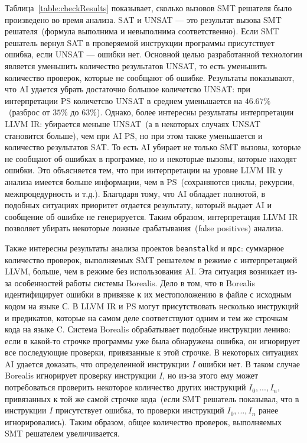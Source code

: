 Таблица~\ref{table:checkResults} показывает, сколько вызовов SMT решателя было
произведено во время анализа. SAT и UNSAT --- это результат вызова 
SMT решателя~(формула выполнима и невыполнима соответственно). Если SMT решатель
вернул SAT в проверяемой инструкции программы присутствует ошибка, если 
UNSAT --- ошибки нет. Основной целью разработанной технологии является уменьшить
количество результатов UNSAT, то есть уменьшить количество проверок, которые не
сообщают об ошибке. Результаты показывают, что AI удается убрать достаточно 
большое количетсво UNSAT: при интерпретации PS количетсво UNSAT в среднем 
уменьшается на $46.67\%$~(разброс от $35\%$ до $63\%$). Однако, более интересны 
результаты интерпретации LLVM IR: убирается меньше UNSAT~(а в некоторых
случаях UNSAT становится больше), чем при AI PS, но при этом также уменьшается 
и количество результатов SAT. То есть AI убирает не только SMT вызовы, которые 
не сообщают об ошибках в программе, но и некоторые вызовы, которые находят 
ошибки. Это объясняется тем, что при интерпретации на уровне LLVM IR у анализа 
имеется больше информации, чем в PS~(сохраняются циклы, рекурсии, 
межпроцедурность и т.д.). Благодаря тому, что AI обладает полнотой, в подобных
ситуациях приоритет отдается результату, который выдает AI и сообщение об
ошибке не генерируется. Таким образом, интерпретация LLVM IR позволяет убирать
некоторые ложные срабатывания~(false positives) анализа.

Также интересны результаты анализа проектов \texttt{beanstalkd} и \texttt{mpc}:
суммарное количество проверок, выполняемых SMT решателем в режиме с 
интерпретацией LLVM, больше, чем в режиме без использования AI. Эта ситуация
возникает из-за особенностей работы системы Borealis. Дело в том, что в Borealis
идентифицирует ошибки в привязке к их местоположению в файле с исходным кодом на
языке С. В LLVM IR и PS могут присутствовать несколько инструкций и предикатов, 
которые на самом деле соответствуют одним и тем же строчкам кода на языке C.
Система Borealis обрабатывает подобные инструкции лениво: если в какой-то
строчке программы уже была обнаружена ошибка, он игнорирует все последующие 
проверки, привязанные к этой строчке. В некоторых ситуациях AI удается доказать,
что определенной инструкции $I$ ошибки нет. В таком случае Borealis игнорирует
проверку инструкции $I$, но из-за этого ему может потребоваться проверить 
некоторое количество других инструкций $I_0, ..., I_n$, привязанных к той же 
самой строчке кода~(если SMT решатель показывал, что в инструкции $I$ 
присутствует ошибка, то проверки инструкций $I_0, ..., I_n$ ранее 
игнорировались). Таким образом, общее количество проверок, выполняемых 
SMT решателем увеличивается.

